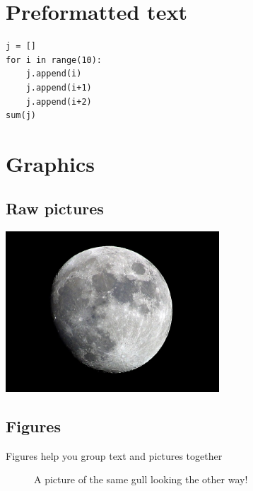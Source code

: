 \documentclass[10pt]{article}
\begin{document}
\section{Preformatted text}

\begin{verbatim}
j = []
for i in range(10):
    j.append(i)
    j.append(i+1)
    j.append(i+2)
sum(j)
\end{verbatim}

\section{Graphics}

\subsection{Raw pictures}

\includegraphics[height=60mm]{moon.jpg}

\subsection{Figures}

Figures help you group text and pictures together

\begin{figure}[!ht]
  \centering
  \caption{A picture of the same gull
           looking the other way!}
\end{figure}
\end{document}
